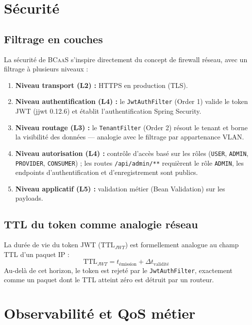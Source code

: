 \documentclass[12pt,a4paper]{report}
\theoremstyle{definition}
\theoremstyle{remark}
\newcommand{\bcaas}{\textsc{BCaaS}}
\newcommand{\jwt}{\textsc{JWT}}
\begin{document}
\chapter{Sécurité}
\label{chap:securite}

\section{Filtrage en couches}

La sécurité de \bcaas{} s'inspire directement du concept de firewall réseau, avec un filtrage à plusieurs niveaux :
\begin{enumerate}
	\item \textbf{Niveau transport (L2) :} HTTPS en production (TLS).
	\item \textbf{Niveau authentification (L4) :} le \texttt{JwtAuthFilter} (Order 1) valide le token \jwt{} (jjwt 0.12.6) et établit l'authentification Spring Security.
	\item \textbf{Niveau routage (L3) :} le \texttt{TenantFilter} (Order 2) résout le tenant et borne la visibilité des données — analogie avec le filtrage par appartenance VLAN.
	\item \textbf{Niveau autorisation (L4) :} contrôle d'accès basé sur les rôles (\texttt{USER}, \texttt{ADMIN}, \texttt{PROVIDER}, \texttt{CONSUMER}) ; les routes \texttt{/api/admin/**} requièrent le rôle \texttt{ADMIN}, les endpoints d'authentification et d'enregistrement sont publics.
	\item \textbf{Niveau applicatif (L5) :} validation métier (Bean Validation) sur les payloads.
\end{enumerate}

\section{TTL du token comme analogie réseau}

La durée de vie du token \jwt{} ($\text{TTL}_{JWT}$) est formellement analogue au champ TTL d'un paquet IP :
\[
\text{TTL}_{JWT} = t_{\text{émission}} + \Delta t_{\text{validité}}
\]
Au-delà de cet horizon, le token est rejeté par le \texttt{JwtAuthFilter}, exactement comme un paquet dont le TTL atteint zéro est détruit par un routeur.

\chapter{Observabilité et QoS métier}
\label{chap:obs}
\end{document}
